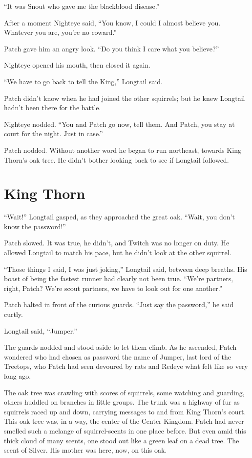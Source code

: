\documentclass[ebook,oneside,openany,17pt]{memoir}
\newenvironment{tolerant}[1]{%
  \par\tolerance=#1\relax
}{%
  \par
}
\renewcommand{\thechapter}{\Roman{chapter}}
\newcounter{sections}
\newcommand{\sections}[1]{%
  \section*{#1}
  \addtocounter{sections}{1}%
  \pdfbookmark[1]{#1}{section.\thechapter.\thesections}}
\begin{document}
“It was Snout who gave me the blackblood disease.”

\begin{tolerant}{500}
After a moment Nighteye said, “You know, I could I almost believe
you. Whatever you are, you’re no coward.”
\end{tolerant}

Patch gave him an angry look. “Do you think I care what you believe?”

Nighteye opened his mouth, then closed it again.

“We have to go back to tell the King,” Longtail said.

Patch didn’t know when he had joined the other squirrels; but he knew
Longtail hadn’t been there for the battle.

Nighteye nodded. “You and Patch go now, tell them. And Patch, you stay
at court for the night. Just in case.”

Patch nodded. Without another word he began to run northeast, towards
King Thorn’s oak tree. He didn’t bother looking back to see if
Longtail followed.


\sections{King Thorn}

“Wait!” Longtail gasped, as they approached the great oak. “Wait, you
don’t know the password!”

Patch slowed. It was true, he didn’t, and Twitch was no longer on
duty. He allowed Longtail to match his pace, but he didn’t look at the
other squirrel.

“Those things I said, I was just joking,” Longtail said, between deep
breaths. His boast of being the fastest runner had clearly not been
true. “We’re partners, right, Patch? We’re scout partners, we have to
look out for one another.”

Patch halted in front of the curious guards. “Just say the password,”
he said curtly.

Longtail said, “Jumper.”

The guards nodded and stood aside to let them climb. As he ascended,
Patch wondered who had chosen as password the name of Jumper, last
lord of the Treetops, who Patch had seen devoured by rats and Redeye
what felt like so very long ago.

The oak tree was crawling with scores of squirrels, some watching and
guarding, others huddled on branches in little groups. The trunk was a
highway of fur as squirrels raced up and down, carrying messages to
and from King Thorn’s court. This oak tree was, in a way, the center
of the Center Kingdom. Patch had never smelled such a melange of
squirrel-scents in one place before. But even amid this thick cloud of
many scents, one stood out like a green leaf on a dead tree. The scent
of Silver. His mother was here, now, on this oak.
\end{document}
